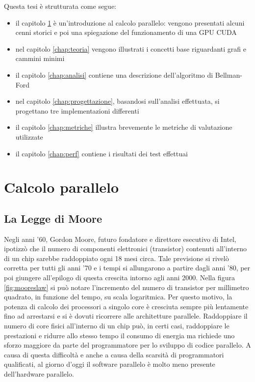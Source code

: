 \documentclass[12pt,a4paper,oneside]{book}
\begin{document}
	Questa tesi è strutturata come segue:
	\begin{itemize}
		\item il capitolo \ref{chap:storia} è un'introduzione al calcolo parallelo: vengono presentati alcuni cenni storici e poi una spiegazione del funzionamento di una GPU CUDA
		\item nel capitolo \ref{chap:teoria} vengono illustrati i concetti base riguardanti grafi e cammini minimi
		\item il capitolo \ref{chap:analisi} contiene una descrizione dell'algoritmo di Bellman-Ford
		\item nel capitolo \ref{chap:progettazione}, basandosi sull'analisi effettuata, si progettano tre implementazioni differenti
		\item il capitolo \ref{chap:metriche} illustra brevemente le metriche di valutazione utilizzate
		\item il capitolo \ref{chap:perf} contiene i risultati dei test effettuai
	\end{itemize}
	
	\chapter{Calcolo parallelo}
	\label{chap:storia}
	\section{La Legge di Moore}
	Negli anni '60, Gordon Moore, futuro fondatore e direttore esecutivo di Intel, ipotizzò che il numero di componenti elettronici (transistor) contenuti all'interno di un chip sarebbe raddoppiato ogni 18 mesi circa\cite{moore1975progress}. Tale previsione si rivelò corretta per tutti gli anni '70 e i tempi si allungarono a partire dagli anni '80, per poi giungere all'epilogo di questa crescita intorno agli anni 2000. Nella figura \ref{fig:mooreslaw} si può notare l'incremento del numero di transistor per millimetro quadrato, in funzione del tempo, su scala logaritmica. Per questo motivo, la potenza di calcolo dei processori a singolo core è cresciuta sempre più lentamente fino ad arrestarsi e si è dovuti ricorrere alle architetture parallele. Raddoppiare il numero di core fisici all'interno di un chip può, in certi casi, raddoppiare le prestazioni e ridurre allo stesso tempo il consumo di energia ma richiede uno sforzo maggiore da parte del programmatore per lo sviluppo di codice parallelo. A causa di questa difficoltà e anche a causa della scarsità di programmatori qualificati, al giorno d'oggi il software parallelo è molto meno presente dell'hardware parallelo.
	
\end{document}
